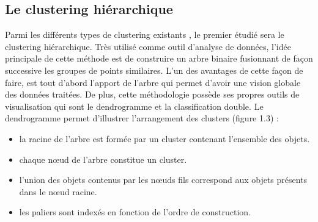 \documentclass[memoire.tex]{subfiles}
\begin{document}
		\subsection{Le clustering hiérarchique}
Parmi les différents types de clustering existants \cite{ref4}, le premier étudié sera le clustering hiérarchique. Très utilisé comme outil d'analyse de données, l'idée principale de cette méthode est de construire un arbre binaire fusionnant de façon successive les groupes de points similaires. L'un des avantages de cette façon de faire,  est tout d'abord l'apport de l'arbre qui permet d'avoir une vision globale des données traitées. De plus, cette méthodologie possède ses propres outils de visualisation qui sont le dendrogramme et la classification double. Le dendrogramme permet d'illustrer l'arrangement des clusters (figure 1.3)\cite{ref8} :
\begin{itemize}
\item la racine de l'arbre est formée par un cluster contenant l'ensemble des objets.
\item chaque nœud de l'arbre constitue un cluster.
\item l'union des objets contenus par les nœuds fils correspond aux objets présents dans le nœud racine.
\item les paliers sont indexés en fonction de l'ordre de construction.
\end{itemize}
\end{document}
